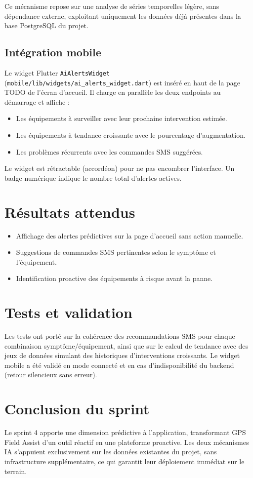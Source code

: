 \documentclass[12pt,a4paper]{report}
\begin{document}
\noindent Ce mécanisme repose sur une analyse de séries temporelles légère, sans dépendance externe, exploitant uniquement les données déjà présentes dans la base PostgreSQL du projet.

\subsection{Intégration mobile}
\noindent Le widget Flutter \texttt{AiAlertsWidget} (\texttt{mobile/lib/widgets/ai\_alerts\_widget.dart}) est inséré en haut de la page TODO de l'écran d'accueil. Il charge en parallèle les deux endpoints au démarrage et affiche :
\begin{itemize}
    \item Les équipements à surveiller avec leur prochaine intervention estimée.
    \item Les équipements à tendance croissante avec le pourcentage d'augmentation.
    \item Les problèmes récurrents avec les commandes SMS suggérées.
\end{itemize}
\noindent Le widget est rétractable (accordéon) pour ne pas encombrer l'interface. Un badge numérique indique le nombre total d'alertes actives.

\section{Résultats attendus}
\begin{itemize}
    \item Affichage des alertes prédictives sur la page d'accueil sans action manuelle.
    \item Suggestions de commandes SMS pertinentes selon le symptôme et l'équipement.
    \item Identification proactive des équipements à risque avant la panne.
\end{itemize}

\section{Tests et validation}
\noindent Les tests ont porté sur la cohérence des recommandations SMS pour chaque combinaison symptôme/équipement, ainsi que sur le calcul de tendance avec des jeux de données simulant des historiques d'interventions croissants. Le widget mobile a été validé en mode connecté et en cas d'indisponibilité du backend (retour silencieux sans erreur).

\section{Conclusion du sprint}
\noindent Le sprint 4 apporte une dimension prédictive à l'application, transformant GPS Field Assist d'un outil réactif en une plateforme proactive. Les deux mécanismes IA s'appuient exclusivement sur les données existantes du projet, sans infrastructure supplémentaire, ce qui garantit leur déploiement immédiat sur le terrain.
\end{document}
